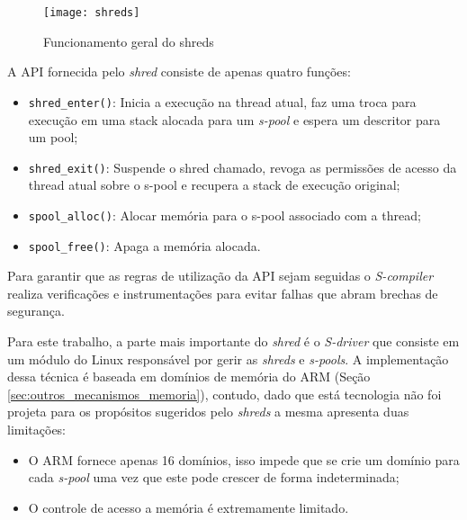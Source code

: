 \begin{figure}[!h]
  \centering
  \texttt{[image: shreds]} 
  \caption{Funcionamento geral do shreds}
  \label{fig:shreds}
\end{figure}

A API fornecida pelo \emph{shred} consiste de apenas quatro funções:

\begin{itemize}
  \item \texttt{shred\_enter()}: Inicia a execução na thread atual, faz uma
        troca para execução em uma stack alocada para um \textit{s-pool} e
        espera um descritor para um pool;
  \item \texttt{shred\_exit()}: Suspende o shred chamado, revoga as permissões
        de acesso da thread atual sobre o s-pool e recupera a stack de execução
        original;
  \item \texttt{spool\_alloc()}: Alocar memória para o s-pool associado com a
        thread;
  \item \texttt{spool\_free()}: Apaga a memória alocada.
\end{itemize}

Para garantir que as regras de utilização da API sejam seguidas o
\emph{S-compiler} realiza verificações e instrumentações para evitar falhas que
abram brechas de segurança.

Para este trabalho, a parte mais importante do \emph{shred} é o \emph{S-driver}
que consiste em um módulo do Linux responsável por gerir as \emph{shreds} e
\emph{s-pools}. A implementação dessa técnica é baseada em domínios de memória
do ARM (Seção \ref{sec:outros_mecanismos_memoria}), contudo, dado que está
tecnologia não foi projeta para os propósitos sugeridos pelo \emph{shreds} a
mesma apresenta duas limitações:

\begin{itemize}
  \item O ARM fornece apenas 16 domínios, isso impede que se crie um domínio
        para cada \emph{s-pool} uma vez que este pode crescer de forma
        indeterminada;
  \item O controle de acesso a memória é extremamente limitado.
\end{itemize}

